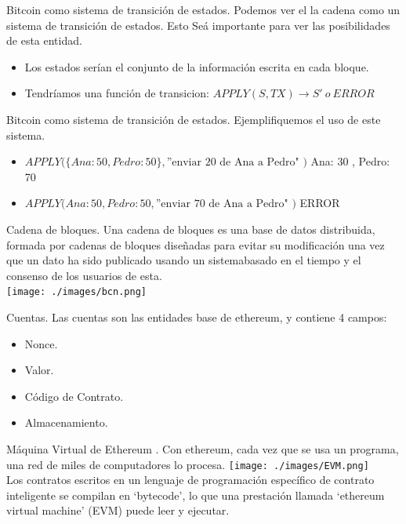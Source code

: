 \documentclass[usenames,dvipsnames]{beamer}
\begin{document}
\begin{frame}{ Bitcoin como sistema de transición de estados. }
Podemos ver el la cadena como un sistema de transición de estados. Esto Seá importante para ver las posibilidades de esta entidad.
\begin{itemize}
	\item Los estados serían el conjunto de la información escrita en cada bloque.
  	\item Tendríamos una  función de transicion: $ APPLY( S , TX ) \to S'\ o\ ERROR$
\end{itemize}
\end{frame}


\begin{frame}{ Bitcoin como sistema de transición de estados. }
Ejemplifiquemos el uso de este sistema.
\begin{itemize}
	\item $ APPLY( \{ Ana: 50 , Pedro: 50 \} , \text{''enviar 20 de Ana a Pedro" )} $
  { Ana: 30 , Pedro: 70 }
  \item  $  APPLY( { Ana: 50 , Pedro: 50 } , \text{''enviar 70 de Ana a Pedro" )} $
  ERROR
\end{itemize}
\end{frame}


\begin{frame} {Cadena de bloques.}
Una cadena de bloques es una base de datos distribuida, formada por cadenas de bloques
diseñadas para evitar su modificación una vez que un dato ha sido publicado usando un sistemabasado en el tiempo y el consenso de los usuarios de esta.\\
\vspace{0.3cm}
\texttt{[image: ./images/bcn.png]}
\end{frame}

\begin{frame}{ Cuentas. }
	Las cuentas son las entidades base de ethereum, y contiene 4 campos:
	\begin{itemize}
	\item Nonce.
	\item Valor.
	\item Código de Contrato.
	\item Almacenamiento.
	\end{itemize}
\end{frame}


\begin{frame}{ Máquina Virtual de Ethereum . }
Con ethereum, cada vez que se usa un programa, una red de miles de computadores lo procesa. 
\texttt{[image: ./images/EVM.png]}\\Los contratos escritos en un lenguaje de programación específico de contrato inteligente se compilan en ‘bytecode’, lo que una prestación llamada ‘ethereum virtual machine’ (EVM) puede leer y ejecutar.

\end{frame}
\end{document}

